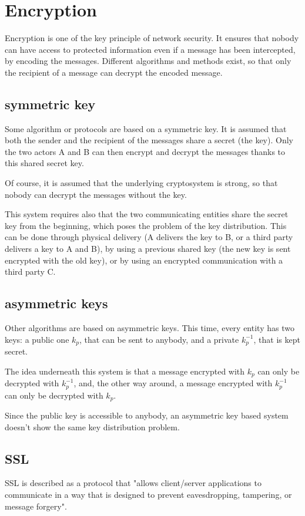 \section{Encryption}
Encryption is one of the key principle of network security. It ensures that nobody can have access to protected information even if a message has been intercepted, by encoding the messages. Different algorithms and methods exist, so that only the recipient of a message can decrypt the encoded message.

\subsection{symmetric key}
\label{sec:02_symmetric_keys}
Some algorithm or protocols are based on a symmetric key. It is assumed that both the sender and the recipient of the messages share a secret (the key). Only the two actors A and B can then encrypt and decrypt the messages thanks to this shared secret key.

Of course, it is assumed that the underlying cryptosystem is strong, so that nobody can decrypt the messages without the key.

This system requires also that the two communicating entities share the secret key from the beginning, which poses the problem of the key distribution. This can be done through physical delivery (A delivers the key to B, or a third party delivers a key to A and B), by using a previous shared key (the new key is sent encrypted with the old key), or by using an encrypted communication with a third party C.
 
\subsection{asymmetric keys}
Other algorithms are based on asymmetric keys. This time, every entity has two keys: a public one $k_{p}$, that can be sent to anybody, and a private $ k_{p}^{-1} $, that is kept secret.

The idea underneath this system is that a message encrypted with $k_{p}$ can only be decrypted with $ k_{p}^{-1} $, and, the other way around, a message encrypted with $ k_{p}^{-1} $ can only be decrypted with $k_{p}$.

Since the public key is accessible to anybody, an asymmetric key based system doesn't show the same key distribution problem.

\subsection{SSL}
SSL is described\cite{freier2011secure} as a protocol that "allows client/server applications to communicate in a way that is designed to prevent eavesdropping, tampering, or message forgery".

